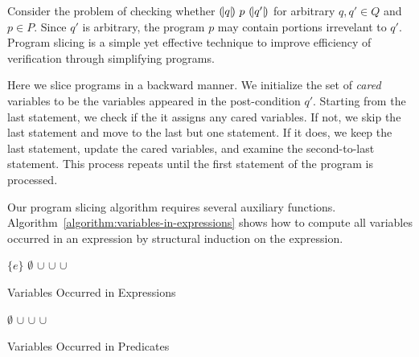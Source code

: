 
Consider the problem of checking whether ${(\!|}{q}{|\!)}~{p}~{(\!|}{q'}{|\!)}$ for
arbitrary $q, q' \in Q$ and $p \in P$. Since $q'$ is arbitrary, the
program $p$ may contain portions irrevelant to $q'$. Program slicing
is a simple yet effective technique to improve efficiency of
verification through simplifying programs.  

Here we slice programs in a backward manner. We initialize the set
of \emph{cared} variables to be the variables appeared in the
post-condition $q'$. Starting from the last statement, we check if the
it assigns any cared variables. If not, we skip the last statement and
move to the last but one statement. If it does, we keep the last
statement, update the cared variables, and examine the second-to-last
statement. This process repeats until the first statement of the
program is processed.

Our program slicing algorithm requires several auxiliary functions. 
Algorithm~\ref{algorithm:variables-in-expressions} shows how to
compute all variables occurred in an expression by structural
induction on the expression. 

\begin{algorithm}[ht]
  \begin{algorithmic}[1]
        \Return $\{ e \}$
      \EndCase
        \Return $\emptyset$
      \EndCase
        \Return {}
      \EndCase
        \Return {} $\cup$ 
      \EndCase
        \Return {} $\cup$ 
      \EndCase
        \Return {} $\cup$ 
      \EndCase
        \Return {}
      \EndCase
    \EndMatch
    \EndFunction
  \end{algorithmic}
  \caption{Variables Occurred in Expressions}
  \label{algorithm:variables-in-expressions}
\end{algorithm}

\begin{algorithm}[ht]
\begin{algorithmic}[1]
    \Case{$\top$}
      $\emptyset$
    \EndCase
      \Return {} $\cup$ 
    \EndCase
      \Return {} $\cup$ 
    \EndCase
      \Return {} $\cup$ 
    \EndCase
  \EndMatch
  \EndFunction
\end{algorithmic}
\caption{Variables Occurred in Predicates}
\label{algorithm:variables-in-predicates}
\end{algorithm}


